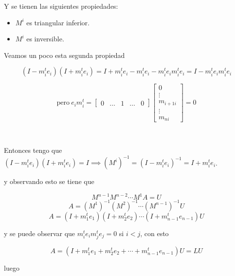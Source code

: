 \noindent Y se tienen las siguientes propiedades:

\begin{itemize}
    \item $M^i$ es triangular inferior.
    \item $M^i$ es inversible.
\end{itemize}

Veamos un poco esta segunda propiedad

\[(I - m_{i}^{t}e_i)(I + m_{i}^{t}e_i) = I + m_{i}^{t}e_i - m_{i}^{t}e_i - m_{i}^{t}e_im_{i}^{t}e_i = I - m_{i}^{t}e_im_{i}^{t}e_i\]

\[\text{pero}~ e_{i}m_{i}^{t} = 
\begin{bmatrix}
0 & \ldots & 1 & \ldots & 0
\end{bmatrix}
\begin{bmatrix}
0 \\
\vdots \\
m_{i+1i} \\
\vdots \\
m_{ni}
\end{bmatrix}
= 0
\]

\

Entonces tengo que $(I - m_{i}^{t}e_i)(I + m_{i}^{t}e_i) = I \implies {(M^{i})}^{-1} = {(I - m_{i}^{t}e_i)}^{-1} = I + m_{i}^{t}e_i$.

y observando esto se tiene que

\[M^{n-1}M^{n-2}\cdots M^{1}A = U\]
\[A = {(M^1)}^{-1}{(M^2)}^{-1}\cdots{(M^{n-1})}^{-1}U\]
\[A=(I+m_{1}^{t}e_1)(I+m_{2}^{t}e_2)\cdots(I + m_{n-1}^{t}e_{n-1})U\]

y se puede observar que $m_{i}^{t}e_{i}m_{j}^{t}e_{j} = 0$ si $i < j$, con esto

\[A = (I + m_{1}^{t}e_{1} + m_{2}^{t}e_{2} + \cdots + m_{n-1}^{t}e_{n-1})U = LU\]

luego

